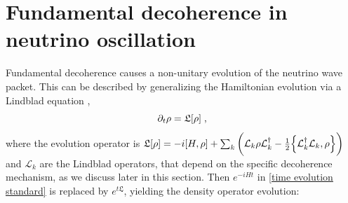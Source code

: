 \documentclass[11pt]{article}
\begin{document}
\section{Fundamental decoherence in neutrino oscillation}
\label{decoherence sec}

Fundamental decoherence causes a non-unitary evolution of the neutrino wave packet. This can be described by generalizing the Hamiltonian evolution via a Lindblad equation \cite{Lindblad1976},
\begin{equation}\label{Lindblad}
    \partial_t \rho = \mathfrak{L}\qty[\rho]\;,
\end{equation}
where the evolution operator is $\mathfrak{L}\qty[\rho] = -i [H,\rho] + \sum_k \qty(\mathcal{L}_k\rho \mathcal{L}_k^\dagger -\frac{1}{2}\pb{\mathcal{L}_k^\dagger \mathcal{L}_k}{\rho})$ and $\mathcal{L}_k$ are the Lindblad operators, that depend on the specific decoherence mechanism, as we discuss later in this section. Then $e^{-iHt}$ in \eqref{time evolution standard} is replaced by $e^{t\mathfrak{L}}$, yielding the density operator evolution: 
\end{document}
